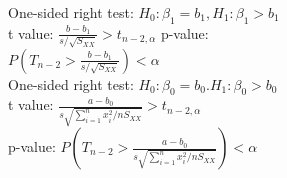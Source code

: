 \documentclass{article}
\begin{document}
\begin{figure}[h!]
\begin{subfigure}[h!]{0.49\textwidth}
        One-sided right test: $H_{0}:\beta_{1}=b_{1},H_{1}:\beta_{1}>b_{1}$\\
        t value: $\frac{b-b_{1}}{s/\sqrt{S_{XX}}}>t_{n-2,\alpha}$ \quad p-value: $P(T_{n-2}>\frac{b-b_{1}}{s/\sqrt{S_{XX}}})<\alpha$\\
        One-sided right test: $H_{0}:\beta_{0}=b_{0}.H_{1}:\beta_{0}>b_{0}$\\
        t value: $\frac{a-b_{0}}{s\sqrt{\sum_{i=1}^{n}x_{i}^{2}/nS_{XX}}}>t_{n-2,\alpha}$\\
        p-value: $P(T_{n-2}>\frac{a-b_{0}}{s\sqrt{\sum_{i=1}^{n}x_{i}^{2}/nS_{XX}}})<\alpha$
    \end{subfigure} 
\end{figure}
\end{document}
